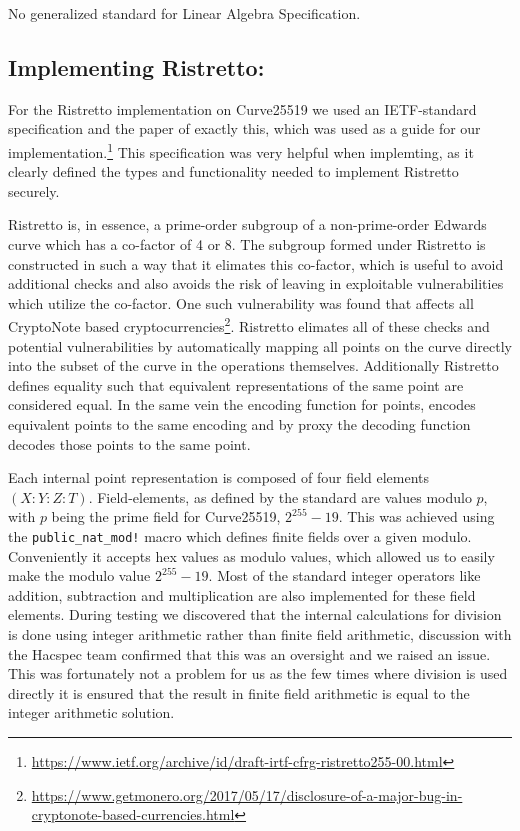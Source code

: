 \documentclass{article}
\begin{document}
No generalized standard for Linear Algebra Specification.

\subsection{Implementing Ristretto:} \label{implementing-ristretto}

For the Ristretto implementation on Curve25519 we used an IETF-standard specification and the paper 
of exactly this, which was used as a guide for our
implementation.\footnote{\url{https://www.ietf.org/archive/id/draft-irtf-cfrg-ristretto255-00.html}}
This specification was very helpful when implemting, as it clearly
defined the types and functionality needed to implement Ristretto
securely.

Ristretto is, in essence, a prime-order subgroup of a non-prime-order
Edwards curve which has a co-factor of 4 or 8. The subgroup formed
under Ristretto is constructed in such a way that it elimates this
co-factor, which is useful to avoid additional checks and also
avoids the risk of leaving in exploitable vulnerabilities which
utilize the co-factor. One such vulnerability was found that affects all CryptoNote based cryptocurrencies\footnote{\url{https://www.getmonero.org/2017/05/17/disclosure-of-a-major-bug-in-cryptonote-based-currencies.html}}. Ristretto elimates all of these checks and
potential vulnerabilities by automatically mapping all points on
the curve directly into the subset of the curve in the operations
themselves. Additionally Ristretto defines equality such that equivalent
representations of the same point are considered equal. In the same
vein the encoding function for points, encodes equivalent points to
the same encoding and by proxy the decoding function decodes those
points to the same point.

Each internal point representation is composed of four field elements
$(X : Y : Z : T)$. Field-elements, as defined by the standard are
values modulo $p$, with $p$ being the prime field for Curve25519,
$2^{255} - 19$. This was achieved using the \texttt{public\_nat\_mod!}
macro which defines finite fields over a given modulo. Conveniently it
accepts hex values as modulo values, which allowed us to easily make
the modulo value $2^{255} - 19$. Most of the standard integer operators
like addition, subtraction and multiplication are also implemented for
these field elements. During testing we discovered that the internal
calculations for division is done using integer arithmetic rather than
finite field arithmetic, discussion with the Hacspec team confirmed
that this was an oversight and we raised an issue. This was fortunately
not a problem for us as the few times where division is used directly
it is ensured that the result in finite field arithmetic is equal to
the integer arithmetic solution.
\end{document}
